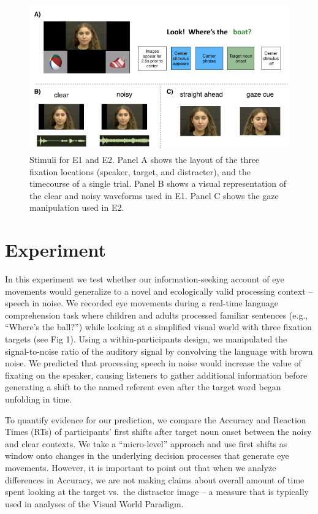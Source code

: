 \documentclass[10pt, letterpaper]{article}
\newenvironment{CodeChunk}{}{}
\begin{document}
\label{}

\begin{CodeChunk}
\begin{figure}[tb]

{\centering \includegraphics[width=0.8\linewidth]{figs/stimuli_plot-1} 

}

\caption[Stimuli for E1 and E2]{Stimuli for E1 and E2. Panel A shows the layout of the three fixation locations (speaker, target, and distracter), and the timecourse of a single trial. Panel B shows a visual representation of the clear and noisy waveforms used in E1. Panel C shows the gaze manipulation used in E2.}\label{fig:stimuli_plot}
\end{figure}
\end{CodeChunk}

\section{Experiment}\label{experiment}

In this experiment we test whether our information-seeking account of
eye movements would generalize to a novel and ecologically valid
processing context -- speech in noise. We recorded eye movements during
a real-time language comprehension task where children and adults
processed familiar sentences (e.g., ``Where's the ball?'') while looking
at a simplified visual world with three fixation targets (see Fig 1).
Using a within-participants design, we manipulated the signal-to-noise
ratio of the auditory signal by convolving the language with brown
noise. We predicted that processing speech in noise would increase the
value of fixating on the speaker, causing listeners to gather additional
information before generating a shift to the named referent even after
the target word began unfolding in time.

To quantify evidence for our prediction, we compare the Accuracy and
Reaction Times (RTs) of participants' first shifts after target noun
onset between the noisy and clear contexts. We take a ``micro-level''
approach and use first shifts as window onto changes in the underlying
decision processes that generate eye movements. However, it is important
to point out that when we analyze differences in Accuracy, we are not
making claims about overall amount of time spent looking at the target
vs.~the distractor image -- a measure that is typically used in analyses
of the Visual World Paradigm.
\end{document}
